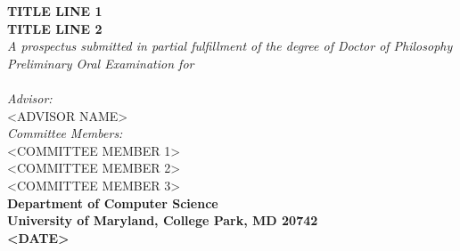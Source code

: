 \documentclass[oneside]{memoir}
\begin{document}
 

\begin{titlingpage}
\begin{center}

\textsc{\huge \bfseries {TITLE LINE 1}}\\[0.25cm]
\textsc{\huge \bfseries {TITLE LINE 2}}\\[0.25cm]
 
\emph{A prospectus submitted in partial fulfillment of the degree of Doctor of
Philosophy}\\[5.5cm]


\emph{Preliminary Oral Examination for}\\
\textsc{}\\[2.0cm] %
\emph{Advisor:} \\
\textsc{<ADVISOR NAME>}\\[.5cm]
\emph{Committee Members:}\\
\textsc{<COMMITTEE MEMBER 1>}\\
\textsc{<COMMITTEE MEMBER 2>}\\
\textsc{<COMMITTEE MEMBER 3>}\\[2.0cm]

{\bfseries Department of Computer Science}\\
{\bfseries University of Maryland, College Park, MD 20742}\\
{\bfseries <DATE>}

\end{center}
\end{titlingpage}

\thispagestyle{empty}
\setcounter{page}{1}
\setcounter{secnumdepth}{3}

\DoubleSpacing
\end{document}
